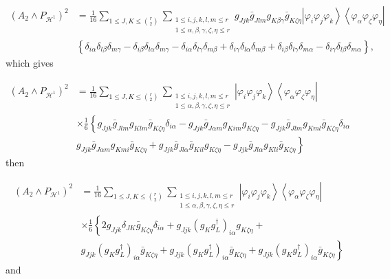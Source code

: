 \documentclass[aps,preprint]{revtex4}%
\begin{document}
\begin{align}
\left(  A_{2}\wedge P_{\mathcal{H}^{1}}\right)  ^{2}  &  =\frac{1}{16}%
\sum_{1\leq J,K\leq\binom{r}{2}}\sum_{\substack{1\leq i,j,k,l,m\leq
r\\1\leq\alpha,\beta,\gamma,\zeta,\eta\leq r}}g_{Jjk}\bar{g}_{Jlm}%
g_{K\beta\gamma}\bar{g}_{K\zeta\eta}\left\vert \varphi_{i}\varphi_{j}%
\varphi_{k}\right\rangle \left\langle \varphi_{\alpha}\varphi_{\zeta}%
\varphi_{\eta}\right\vert \\
&  \left\{  \delta_{i\alpha}\delta_{l\beta}\delta_{m\gamma}-\delta_{i\beta
}\delta_{l\alpha}\delta_{m\gamma}-\delta_{i\alpha}\delta_{l\gamma}%
\delta_{m\beta}\right.  +\left.  \delta_{i\gamma}\delta_{l\alpha}%
\delta_{m\beta}+\delta_{i\beta}\delta_{l\gamma}\delta_{m\alpha}-\delta
_{i\gamma}\delta_{l\beta}\delta_{m\alpha}\right\}  ,
\end{align}
which gives%

\begin{align}
\left(  A_{2}\wedge P_{\mathcal{H}^{1}}\right)  ^{2}  &  =\frac{1}{16}%
\sum_{1\leq J,K\leq\binom{r}{2}}\sum_{\substack{1\leq i,j,k,l,m\leq
r\\1\leq\alpha,\beta,\gamma,\zeta,\eta\leq r}}\left\vert \varphi_{i}%
\varphi_{j}\varphi_{k}\right\rangle \left\langle \varphi_{\alpha}%
\varphi_{\zeta}\varphi_{\eta}\right\vert \\
&  \times\frac{1}{6}\left\{  g_{Jjk}\bar{g}_{Jlm}g_{Klm}\bar{g}_{K\zeta\eta
}\delta_{i\alpha}-g_{Jjk}\bar{g}_{J\alpha m}g_{Kim}g_{K\zeta\eta}-g_{Jjk}%
\bar{g}_{Jlm}g_{Kml}\bar{g}_{K\zeta\eta}\delta_{i\alpha}\right. \\
&  \left.  g_{Jjk}\bar{g}_{J\alpha m}g_{Kmi}\bar{g}_{K\zeta\eta}+g_{Jjk}%
\bar{g}_{Jl\alpha}\bar{g}_{Kil}g_{K\zeta\eta}-g_{Jjk}\bar{g}_{Jl\alpha}%
g_{Kli}\bar{g}_{K\zeta\eta}\right\}
\end{align}
then%

\begin{align}
\left(  A_{2}\wedge P_{\mathcal{H}^{1}}\right)  ^{2}  &  =\frac{1}{16}%
\sum_{1\leq J,K\leq\binom{r}{2}}\sum_{\substack{1\leq i,j,k,l,m\leq
r\\1\leq\alpha,\beta,\gamma,\zeta,\eta\leq r}}\left\vert \varphi_{i}%
\varphi_{j}\varphi_{k}\right\rangle \left\langle \varphi_{\alpha}%
\varphi_{\zeta}\varphi_{\eta}\right\vert \\
&  \times\frac{1}{6}\left\{  2g_{Jjk}\delta_{JK}\bar{g}_{K\zeta\eta}%
\delta_{i\alpha}+g_{Jjk}\left(  g_{K}g_{L}^{\dagger}\right)  _{i\alpha
}g_{K\zeta\eta}+\right. \\
&  \left.  g_{Jjk}\left(  g_{K}g_{L}^{\dagger}\right)  _{i\alpha}\bar
{g}_{K\zeta\eta}+g_{Jjk}\left(  g_{K}g_{L}^{\dagger}\right)  _{i\alpha}\bar
{g}_{K\zeta\eta}+g_{Jjk}\left(  g_{K}g_{L}^{\dagger}\right)  _{i\alpha}\bar
{g}_{K\zeta\eta}\right\}
\end{align}
and%
\end{document}
